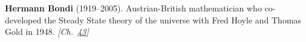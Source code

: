 \textbf{Hermann Bondi} (1919–2005). Austrian-British mathematician who co-developed the Steady State theory of the universe with Fred Hoyle and Thomas Gold in 1948. \emph{[Ch.~\hyperref[ch:nearflatuniverse]{43}]}

